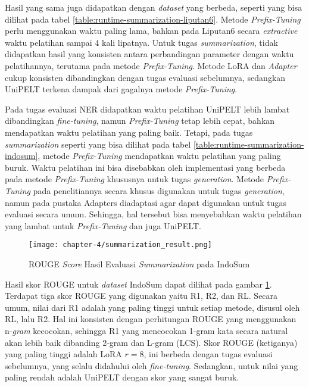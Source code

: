 Hasil yang sama juga didapatkan dengan \textit{dataset} yang berbeda, seperti yang bisa dilihat pada tabel \ref{table:runtime-summarization-liputan6}. Metode \textit{Prefix-Tuning} perlu menggunakan waktu paling lama, bahkan pada Liputan6 secara \textit{extractive} waktu pelatihan sampai 4 kali lipatnya. Untuk tugas \textit{summarization}, tidak didapatkan hasil yang konsisten antara perbandingan parameter dengan waktu pelatihannya, terutama pada metode \textit{Prefix-Tuning}. Metode LoRA dan \textit{Adapter} cukup konsisten dibandingkan dengan tugas evaluasi sebelumnya, sedangkan UniPELT terkena dampak dari gagalnya metode \textit{Prefix-Tuning}.

Pada tugas evaluasi NER didapatkan waktu pelatihan UniPELT lebih lambat dibandingkan \textit{fine-tuning}, namun \textit{Prefix-Tuning} tetap lebih cepat, bahkan mendapatkan waktu pelatihan yang paling baik. Tetapi, pada tugas \textit{summarization} seperti yang bisa dilihat pada tabel \ref{table:runtime-summarization-indosum}, metode \textit{Prefix-Tuning} mendapatkan waktu pelatihan yang paling buruk. Waktu pelatihan ini bisa disebabkan oleh implementasi yang berbeda pada metode \textit{Prefix-Tuning} khususnya untuk tugas \textit{generation}. Metode \textit{Prefix-Tuning} pada penelitiannya secara khusus digunakan untuk tugas \textit{generation}, namun pada pustaka Adapters diadaptasi agar dapat digunakan untuk tugas evaluasi secara umum. Sehingga, hal tersebut bisa menyebabkan waktu pelatihan yang lambat untuk \textit{Prefix-Tuning} dan juga UniPELT.

\begin{figure}[h]
    \centering
    \centerline{\texttt{[image: chapter-4/summarization\_result.png]}}
    \caption{ROUGE \textit{Score} Hasil Evaluasi \textit{Summarization} pada IndoSum}
    \label{fig:summarization-result-indosum}
\end{figure}

Hasil skor ROUGE untuk \textit{dataset} IndoSum dapat dilihat pada gambar \ref{fig:summarization-result-indosum}. Terdapat tiga skor ROUGE yang digunakan yaitu R1, R2, dan RL. Secara umum, nilai dari R1 adalah yang paling tinggi untuk setiap metode, disusul oleh RL, lalu R2. Hal ini konsisten dengan perhitungan ROUGE yang menggunakan n-\textit{gram} kecocokan, sehingga R1 yang mencocokan 1-gram kata secara natural akan lebih baik dibanding 2-gram dan L-gram (LCS). Skor ROUGE (ketiganya) yang paling tinggi adalah LoRA $r=8$, ini berbeda dengan tugas evaluasi sebelumnya, yang selalu didahului oleh \textit{fine-tuning}. Sedangkan, untuk nilai yang paling rendah adalah UniPELT dengan skor yang sangat buruk.

